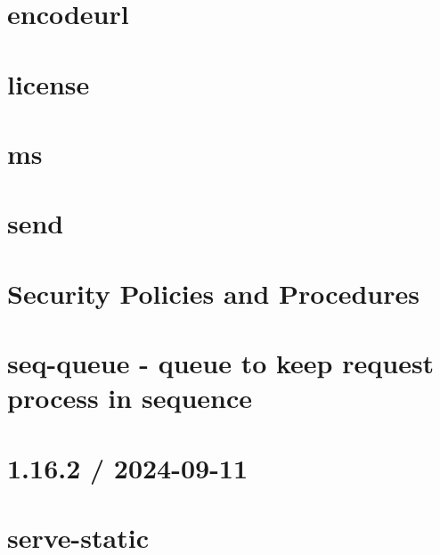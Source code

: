 \documentclass[twoside]{book}
\newcommand{\+}{\discretionary{\mbox{\scriptsize$\hookleftarrow$}}{}{}}
\begin{document}
\chapter{encodeurl}
\label{md_src_nodejs_node_modules_send_node_modules_encodeurl_README}

\chapter{license}
\label{md_src_nodejs_node_modules_send_node_modules_ms_license}

\chapter{ms}
\label{md_src_nodejs_node_modules_send_node_modules_ms_readme}

\chapter{send}
\label{md_src_nodejs_node_modules_send_README}

\chapter{Security Policies and Procedures}
\label{md_src_nodejs_node_modules_send_SECURITY}

\chapter{seq-\/queue -\/ queue to keep request process in sequence}
\label{md_src_nodejs_node_modules_seq_queue_README}

\chapter{1.16.2 / 2024-\/09-\/11}
\label{md_src_nodejs_node_modules_serve_static_HISTORY}

\chapter{serve-\/static}
\label{md_src_nodejs_node_modules_serve_static_README}

\end{document}
